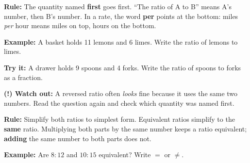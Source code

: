 \documentclass[12pt]{article}
\begin{document}


\begin{formulabox}
\textbf{Rule:} The quantity named \textbf{first} goes first. ``The ratio of A to
B'' means A's number, then B's number. In a rate, the word \textbf{per} points at
the bottom: miles \emph{per} hour means miles on top, hours on the bottom.
\end{formulabox}

\begin{examplebox}
\textbf{Example:} \quad A basket holds 11 lemons and 6 limes. Write the ratio of
lemons to limes.
\end{examplebox}

\begin{tryitbox}
\textbf{Try it:} \quad A drawer holds 9 spoons and 4 forks. Write the ratio of
spoons to forks as a fraction.\\[2pt]
\end{tryitbox}

\begin{watchoutbox}
\textbf{(!) Watch out:} A reversed ratio often \emph{looks} fine because it uses
the same two numbers. Read the question again and check which quantity was named
first.
\end{watchoutbox}


\begin{formulabox}
\textbf{Rule:} Simplify both ratios to simplest form. Equivalent ratios simplify
to the \textbf{same} ratio. Multiplying both parts by the same number keeps a
ratio equivalent; \textbf{adding} the same number to both parts does not.
\end{formulabox}

\begin{examplebox}
\textbf{Example:} \quad Are $8{:}12$ and $10{:}15$ equivalent? Write $=$ or
$\neq$.
\end{examplebox}
\end{document}
